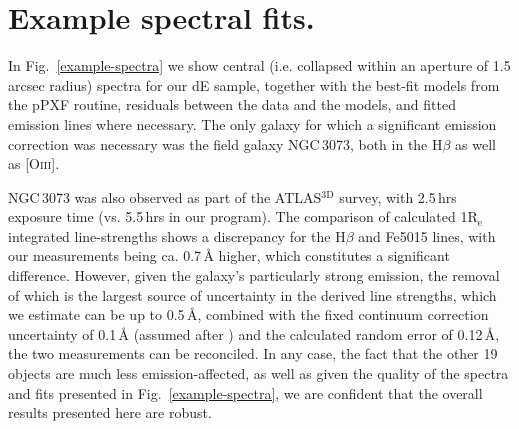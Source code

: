 \documentclass[useAMS,usenatbib]{mn2e}
\newcommand{\re}{$\mathrm{R_e}$}
\newcommand{\hb}{H$\beta$}
\newcommand{\atlas}{ATLAS$^{\mathrm{3D}}$}
\begin{document}


\appendix

\section{Example spectral fits.}
\label{appendix-spectra}

In Fig.~\ref{example-spectra} we show central (i.e. collapsed within an aperture of 1.5 arcsec radius) spectra for our dE sample, together with the best-fit models from the pPXF routine, residuals between the data and the models, and fitted emission lines where necessary. The only galaxy for which a significant emission correction was necessary was the field galaxy NGC\,3073, both in the {\hb} as well as [O{\textsc{iii}}]. 

NGC\,3073 was also observed as part of the {\atlas} survey, with 2.5\,hrs exposure time (vs. 5.5\,hrs in our program). The comparison of calculated 1{\re} integrated line-strengths shows a discrepancy for the {\hb} and Fe5015 lines, with our measurements being ca. 0.7\,{\AA} higher, which constitutes a significant difference. However, given the galaxy's particularly strong emission, the removal of which is the largest source of uncertainty in the derived line strengths, which we estimate can be up to 0.5\,{\AA}, combined with the fixed continuum correction uncertainty of 0.1\,{\AA} (assumed after \citealt{kuntschner:2010}) and the calculated random error of 0.12\,{\AA}, the two measurements can be reconciled. In any case, the fact that the other 19 objects are much less emission-affected, as well as given the quality of the spectra and fits presented in Fig.~\ref{example-spectra}, we are confident that the overall results presented here are robust.
\end{document}
